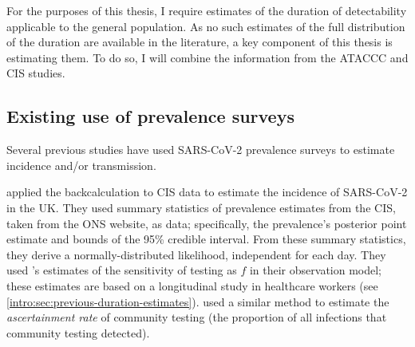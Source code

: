 \documentclass[thesis.tex]{subfiles}
\begin{document}
For the purposes of this thesis, I require estimates of the duration of detectability applicable to the general population.
As no such estimates of the full distribution of the duration are available in the literature, a key component of this thesis is estimating them.
To do so, I will combine the information from the ATACCC and CIS studies.


\subsection{Existing use of prevalence surveys}

Several previous studies have used SARS-CoV-2 prevalence surveys to estimate incidence and/or transmission.

\Textcite{abbottCISincidence} applied the backcalculation to CIS data to estimate the incidence of SARS-CoV-2 in the UK.
They used summary statistics of prevalence estimates from the CIS, taken from the ONS website, as data; specifically, the prevalence's posterior point estimate and bounds of the 95\% credible interval.
From these summary statistics, they derive a normally-distributed likelihood, independent for each day.
They used \textcite{hellewellPCRSensitivity}'s estimates of the sensitivity of testing as $f$ in their observation model; these estimates are based on a longitudinal study in healthcare workers (see \cref{intro:sec:previous-duration-estimates}).
\Textcite{colmanAscertainment} used a similar method to estimate the \emph{ascertainment rate} of community testing (the proportion of all infections that community testing detected).
\end{document}
